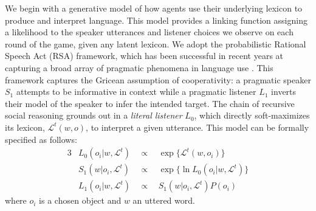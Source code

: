 \documentclass[10pt,letterpaper]{article}
\begin{document}
We begin with a generative model of how agents use their underlying lexicon to produce and interpret language. This model provides a linking function assigning a likelihood to the speaker utterances and listener choices we observe on each round of the game, given any latent lexicon. We adopt the probabilistic Rational Speech Act (RSA) framework, which has been successful in recent years at capturing a broad array of pragmatic phenomena in language use \cite{GoodmanFrank16_RSATiCS,FrankeJager16_ProbabilisticPragmatics}. This framework captures the Gricean assumption of cooperativity: a pragmatic speaker $S_1$ attempts to be informative in context while a pragmatic listener $L_1$ inverts their model of the speaker to infer the intended target. The chain of recursive social reasoning grounds out in a \emph{literal listener} $L_0$, which directly soft-maximizes its lexicon, $\mathcal{L}^t(w,o)$, to interpret a given utterance. This model can be formally specified as follows:
\begin{alignat*}{3}
& L_0(o_i | w, \mathcal{L}^t) &\ \ \propto \ \ & \exp\{\mathcal{L}^t(w,o_i)\} \\
& S_1(w | o_i, \mathcal{L}^t) &\ \ \propto \ \ & \exp\{\ln L_0(o_i | w, \mathcal{L}^t)\} \\
& L_1(o_i | w, \mathcal{L}^t) &\ \ \propto \ \ & S_1(w | o_i, \mathcal{L}^t) P(o_i) 
\end{alignat*}
where $o_i$ is a chosen object and $w$ an uttered word.
\end{document}
